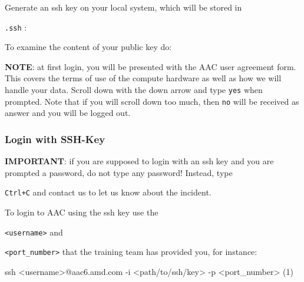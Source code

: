 \documentclass[
]{article}
\let\oldtexttt\texttt
\renewcommand{\texttt}[1]{
  \colorbox{Light}{\oldtexttt{#1}}
}
\newenvironment{Shaded}{}{}
\newcommand{\BuiltInTok}[1]{#1}
\newcommand{\FunctionTok}[1]{\textcolor[rgb]{0.02,0.16,0.49}{#1}}
\newcommand{\NormalTok}[1]{#1}
\newcommand{\OperatorTok}[1]{\textcolor[rgb]{0.40,0.40,0.40}{#1}}
\newcommand{\StringTok}[1]{\textcolor[rgb]{0.25,0.44,0.63}{#1}}
\newcommand{\VariableTok}[1]{\textcolor[rgb]{0.10,0.09,0.49}{#1}}
\begin{document}
Generate an ssh key on your local system, which will be stored in
\texttt{.ssh}:

\begin{Shaded}
\end{Shaded}

To examine the content of your public key do:

\begin{Shaded}
\end{Shaded}

\textbf{NOTE}: at first login, you will be presented with the AAC user
agreement form. This covers the terms of use of the compute hardware as
well as how we will handle your data. Scroll down with the down arrow
and type \texttt{yes} when prompted. Note that if you will scroll down
too much, then \texttt{no} will be received as answer and you will be
logged out.

\hypertarget{login-with-ssh-key}{%
\subsubsection{Login with SSH-Key}\label{login-with-ssh-key}}

\textbf{IMPORTANT}: if you are supposed to login with an ssh key and you
are prompted a password, do not type any password! Instead, type
\texttt{Ctrl+C} and contact us to let us know about the incident.

To login to AAC using the ssh key use the
\texttt{\textless{}username\textgreater{}} and
\texttt{\textless{}port\_number\textgreater{}} that the training team
has provided you, for instance:

\begin{Shaded}
\begin{Highlighting}[]
\FunctionTok{ssh} \OperatorTok{\textless{}}\NormalTok{username}\OperatorTok{\textgreater{}}\NormalTok{@aac6.amd.com {-}i }\OperatorTok{\textless{}}\NormalTok{path/to/ssh/key}\OperatorTok{\textgreater{}}\NormalTok{ {-}p }\OperatorTok{\textless{}}\NormalTok{port\_number}\OperatorTok{\textgreater{}}\NormalTok{ (1)}
\end{Highlighting}
\end{Shaded}
\end{document}
